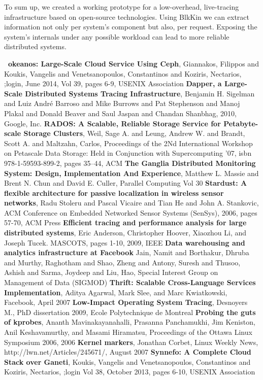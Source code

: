 \documentclass[a4paper,10pt,twocolumn]{article}
\begin{document}
To sum up, we created a working prototype for a low-overhead, live-tracing
infrastructure based on open-source technologies. Using BlkKin we can extract
information not only per system's component but also, per request. Exposing the
system's internals under any possible workload can lead to more reliable
distributed systems.

\begin{thebibliography}{9}
 \textbf{~okeanos: Large-Scale Cloud Service Using Ceph},
 Giannakos, Filippos and  Koukis, Vangelis and Venetsanopoulos, Constantinos and Koziris, Nectarios,
 ;login,
 June 2014,
 Vol 39,
 pages 6-9,
 USENIX Association
    \textbf{Dapper, a Large-Scale Distributed Systems Tracing Infrastructure},
    Benjamin H.
    Sigelman and Luiz André Barroso and Mike Burrows and Pat Stephenson and Manoj
    Plakal and Donald Beaver and Saul Jaspan and Chandan Shanbhag, 2010, Google,
    Inc.
 \textbf{RADOS: A Scalable, Reliable Storage Service for Petabyte-scale Storage Clusters},
 Weil, Sage A. and Leung, Andrew W. and Brandt, Scott A. and Maltzahn, Carlos,
 Proceedings of the 2Nd International Workshop on Petascale Data Storage: Held in Conjunction with Supercomputing '07,
 isbn 978-1-59593-899-2,
 pages 35--44,
 ACM
 \textbf{The Ganglia Distributed Monitoring System: Design, Implementation And Experience},
 Matthew L. Massie and Brent N. Chun and David E. Culler,
 Parallel Computing Vol 30
    \textbf{Stardust: A flexible architecture for passive localization in wireless sensor networks},
    Radu Stoleru and Pascal Vicaire and Tian He and John A. Stankovic,
    ACM Conference on Embedded Networked Sensor Systems (SenSys),
    2006,
    pages 57-70,
    ACM Press
    \textbf{Efficient tracing and performance analysis for large distributed systems},
    Eric Anderson, Christopher Hoover, Xiaozhou Li, and Joseph Tucek. 
    MASCOTS, 
    pages 1-10,
    2009,
    IEEE
  \textbf{Data warehousing and analytics infrastructure at Facebook}
  Jain, Namit and
    Borthakur, Dhruba and
    Murthy, Raghotham and
    Shao, Zheng and
    Antony, Suresh and
    Thusoo, Ashish and
    Sarma, Joydeep and
    Liu, Hao,
  Special Interest Group on Management of Data (SIGMOD)
    \textbf{Thrift: Scalable Cross-Language Services Implementation},
    Aditya Agarwal, Mark Slee, and Marc Kwiatkowski,
    Facebook, 
    April 2007
    \textbf{Low-Impact Operating System Tracing},
    Desnoyers M.,
    PhD dissertation
    2009,
    Ecole Polytechnique de Montreal
    \textbf{Probing the guts of kprobes},
    Ananth Mavinakayanahalli, Prasanna
    Panchamukhi, Jim Keniston, Anil
    Keshavamurthy, and Masami Hiramatsu,
    Proceedings of the Ottawa Linux
    Symposium 2006, 2006
    \textbf{Kernel markers},
    Jonathan Corbet,
     Linux Weekly News, 
    http://lwn.net/Articles/245671/,
    August 2007
    \textbf{Synnefo: A Complete Cloud Stack over Ganeti},
    Koukis, Vangelis and Venetsanopoulos, Constantinos and Koziris, Nectarios,
    ;login Vol 38,
    October 2013,
    pages 6-10,
    USENIX Association
\end{thebibliography}
\end{document}
